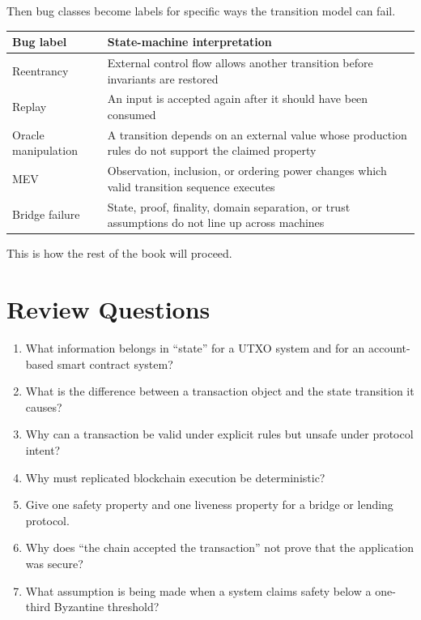 Then bug classes become labels for specific ways the transition model
can fail.

{\def\LTcaptype{none} %
\begin{longtable}[]{@{}
  >{\raggedright\arraybackslash}p{}
  >{\raggedright\arraybackslash}p{}@{}}
\toprule\noalign{}
\begin{minipage}[b]{\linewidth}\raggedright
Bug label
\end{minipage} & \begin{minipage}[b]{\linewidth}\raggedright
State-machine interpretation
\end{minipage} \\
\midrule\noalign{}
\endhead
\bottomrule\noalign{}
\endlastfoot
Reentrancy & External control flow allows another transition before
invariants are restored \\
Replay & An input is accepted again after it should have been
consumed \\
Oracle manipulation & A transition depends on an external value whose
production rules do not support the claimed property \\
MEV & Observation, inclusion, or ordering power changes which valid
transition sequence executes \\
Bridge failure & State, proof, finality, domain separation, or trust
assumptions do not line up across machines \\
\end{longtable}
}

This is how the rest of the book will proceed.

\section{Review Questions}

\begin{enumerate}
\def\labelenumi{\arabic{enumi}.}
\tightlist
\item
  What information belongs in ``state'' for a UTXO system and for an
  account-based smart contract system?
\item
  What is the difference between a transaction object and the state
  transition it causes?
\item
  Why can a transaction be valid under explicit rules but unsafe under
  protocol intent?
\item
  Why must replicated blockchain execution be deterministic?
\item
  Give one safety property and one liveness property for a bridge or
  lending protocol.
\item
  Why does ``the chain accepted the transaction'' not prove that the
  application was secure?
\item
  What assumption is being made when a system claims safety below a
  one-third Byzantine threshold?
\end{enumerate}


